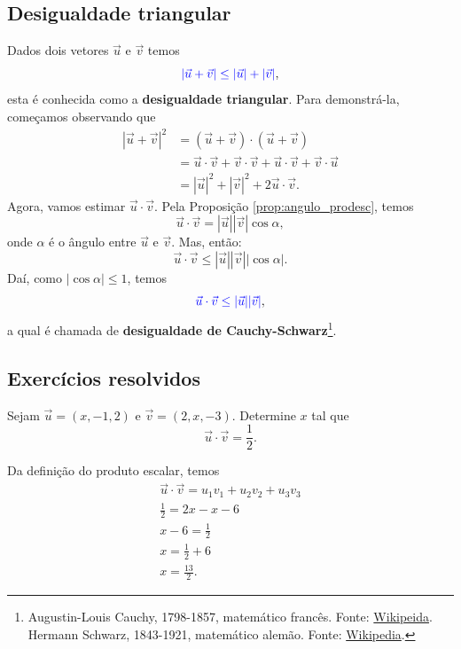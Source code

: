 \subsection{Desigualdade triangular}

Dados dois vetores $\vec{u}$ e $\vec{v}$ temos
\begin{equation}
  {\color{blue}|\vec{u}+\vec{v}| \leq |\vec{u}| + |\vec{v}|},
\end{equation}
esta é conhecida como a {\bf desigualdade triangular}. Para demonstrá-la, começamos observando que
\begin{align}
  |\vec{u}+\vec{v}|^2 &= (\vec{u}+\vec{v})\cdot(\vec{u}+\vec{v})\\
                      &= \vec{u}\cdot\vec{v}+\vec{v}\cdot\vec{v}+\vec{u}\cdot\vec{v}+\vec{v}\cdot\vec{u}\\
                      &= |\vec{u}|^2 + |\vec{v}|^2 + 2\vec{u}\cdot\vec{v}.  
\end{align}
Agora, vamos estimar $\vec{u}\cdot\vec{v}$. Pela Proposição \ref{prop:angulo_prodesc}, temos
\begin{equation}
  \vec{u}\cdot\vec{v} = |\vec{u}||\vec{v}|\cos\alpha,
\end{equation}
onde $\alpha$ é o ângulo entre $\vec{u}$ e $\vec{v}$. Mas, então:
\begin{equation}
  \vec{u}\cdot\vec{v} \leq |\vec{u}||\vec{v}||\cos\alpha|.
\end{equation}
Daí, como $|\cos\alpha|\leq 1$, temos
\begin{equation}
  {\color{blue}\vec{u}\cdot\vec{v}\leq |\vec{u}||\vec{v}|},
\end{equation}
a qual é chamada de {\bf desigualdade de Cauchy-Schwarz}\footnote{Augustin-Louis Cauchy, 1798-1857, matemático francês. Fonte: \href{https://en.wikipedia.org/wiki/Augustin-Louis_Cauchy}{Wikipeida}. Hermann Schwarz, 1843-1921, matemático alemão. Fonte: \href{https://en.wikipedia.org/wiki/Hermann\_Schwarz}{Wikipedia}.}.

\subsection{Exercícios resolvidos}

\begin{exeresol}
  Sejam $\vec{u}=(x,-1,2)$ e $\vec{v}=(2,x,-3)$. Determine $x$ tal que
  \begin{equation}
    \vec{u}\cdot\vec{v}=\frac{1}{2}.
  \end{equation}
\end{exeresol}
\begin{resol}
  Da definição do produto escalar, temos
  \begin{gather}
    \vec{u}\cdot\vec{v} = u_1v_1 + u_2v_2 + u_3v_3 \\
    \frac{1}{2} = 2x - x - 6 \\
    x - 6 = \frac{1}{2} \\
    x = \frac{1}{2} + 6 \\
    x = \frac{13}{2}.
  \end{gather}
\end{resol}

